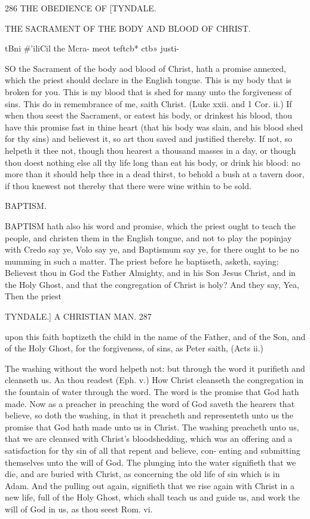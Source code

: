 \documentclass{custom}
\begin{document}
{{286
THE OBEDIENCE OF
[TYNDALE.

THE SACRAMENT OF THE BODY AND BLOOD 
OF CHRIST. 

tBni #'iliCil 
the Mcra- 
meot teftcb* 
ctb» justi- 

SO the Sacrament of the body aod blood of Christ, hath 
a promise annexed, which the priest should declare in 
the English tongue. This is my body that is broken for 
you. This is my blood that is shed for many unto the 
forgiveness of sins. This do in remembrance of me, saith 
Christ. (Luke xxii. and 1 Cor. ii.) If when thou seest 
the Sacrament, or eatest his body, or drinkest his blood, 
thou have this promise fast in thine heart (that his body 
was slain, and his blood shed for thy sins) and believest it, 
so art thou saved and justified thereby. If not, so helpeth 
it thee not, though thou hearest a thousand masses in a 
day, or though thou doest nothing else all thy life long than 
eat his body, or drink his blood: no more than it should 
help thee in a dead thirst, to behold a bush at a tavern 
door, if thou knewest not thereby that there were wine 
within to be sold. 


BAPTISM. 

BAPTISM hath also his word and promise, which the 
priest ought to teach the people, and christen them in 
the English tongue, and not to play the popinjay with 
Credo say ye, Volo say ye, and Baptismum say ye, 
for there ought to be no mumming in such a matter. The 
priest before he baptiseth, asketh, saying: Believest thou 
in God the Father Almighty, and in his Son Jesus Christ, 
and in the Holy Ghost, and that the congregation of 
Christ is holy? And they say, Yea, Then the priest 


TYNDALE.]
A CHRISTIAN MAN.
287

upon this faith baptizeth the child in the name of the 
Father, and of the Son, and of the Holy Ghost, for the 
forgiveness, of sins, as Peter saith, (Acts ii.) 

The washing without the word helpeth not: but through 
the word it purifieth and cleanseth us. Aa thou readest 
(Eph. v.) How Christ cleanseth the congregation in the 
fountain of water through the word. The word is the 
promise that God hath made. Now as a preacher in 
preaching the word of God saveth the hearers that believe, 
so doth the washing, in that it preacheth and representeth 
unto us the promise that God hath made unto us in Christ. 
The washing preacheth unto us, that we are cleansed 
with Christ's bloodshedding, which was an offering and a 
satisfaction for thy sin of all that repent and believe, con- 
enting and submitting themselves unto the will of God. 
The plunging into the water signifieth that we die, and 
are buried with Christ, as concerning the old life of sin 
which is in Adam. And the pulling out again, signifieth 
that we rise again with Christ in a new life, full of the 
Holy Ghost, which shall teach us and guide us, and work 
the will of God in us, as thou seest Rom. vi. 

}}
\end{document}
